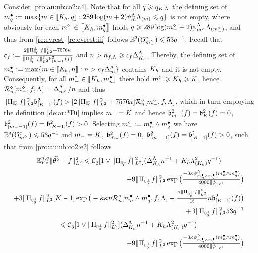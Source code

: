 \begin{pro}
Consider \ref{pro:au:ub:co2:c4}. Note that for all $\ssE\geq \ssE_{K,\iSv}$ the defining set of
$\sDi{\ssE}:=\max\{\Di\in\nset{K_{\ydf},\ssE}:289\log(\Di+2)\cmiSv[\Di]\miSv[\Di]\leq\ssE\}$
is not empty, where obviously for each
$\mdDi\in\nset{K_{\ydf},\sDi{\ssE}}$ holds 
$\ssE\geq289\log(\mdDi+2)\cmiSv[\mdDi]\miSv[\mdDi]$, and thus from
\cref{re:evrest} \ref{re:evrest:iii} follows
$\FuVg[\ssE]{\rE}(\aixEv[\mdDi]^c)\leq 53\ssE^{-1}$.
Recall that $c_{\xdf}:=\tfrac{2\VnormLp{\Proj[{\mHiH[0]}]^\perp\xdf}^2+7576\cpen}{\VnormLp{\Proj[{\mHiH[0]}]^\perp\xdf}^2\bias[{[K-1]}]^2(\xdf)}$
and $\ssY>\ssY_{\xdf,\iSv}\geq c_{\xdf}\DipenSv[K_{\ydf}]$. Thereby,
the defining set of
$\sDi{\ssY}:=\max\{\Di\in\nset{K_{\ydf},\ssY}:\ssY>c_{\xdf}\DipenSv\}$
contains $K_{\ydf}$ and it is not empty. Consequently, for all
$\mdDi\in\nset{K_{\ydf},\sDi{\ssY}}$ there hold $\mdDi\geq K_{\ydf}\geq K$, hence
$\hRaDi{\mdDi,\xdf,\iSv}=\DipenSv[\mdDi]/\ssY$  and thus $\VnormLp{\Proj[{\mHiH[0]}]^\perp\xdf}^2\bias[{[K-1]}]^2(\xdf)>[2\VnormLp{\Proj[{\mHiH[0]}]^\perp\xdf}^2+7576\cpen]\hRaDi{\mdDi,\xdf,\iSv}$,
  which in turn employing the definition
  \eqref{de:au:*Di} implies  $\mDi=K$ and hence
  $\bias[\mDi]^2(\xdf)=\bias[K]^2(\xdf)=0$,
  $\bias[{[\mDi-1]}]^2(\xdf)=\bias[{[K-1]}]^2(\xdf)>0$. Selecting
  $\mdDi:=\sDi{\ssY}\wedge\sDi{\ssE}$ we have 
$\FuVg[\ssE]{\rE}(\aixEv[\mdDi]^c)\leq 53\ssE^{-1}$ and 
$\mDi=K$, $\bias[\mDi]^2(\xdf)=0$,
  $\bias[{[\mDi-1]}]^2(\xdf)=\bias[{[K-1]}]^2(\xdf)>0$, such that 
 from  \eqref{pro:au:ub:co2:e2} follows
\begin{multline}\label{pro:au:ub:co2:e4}
\FuEx[\ssY,\ssE]{\rY,\rE}\VnormLp{\hxdfPr[]-\xdf}^2
\leq\cst{2}[1\vee\VnormLp{\Proj[{\mHiH[0]^\perp}]\xdf}^2](\DipenSv[K_{\ydf}]\ssY^{-1}+K_{\ydf}\miSv[K_{\ydf}]^2\ssE^{-1})
\\
\hfill+9
\VnormLp{\Proj[{\mHiH[0]^\perp}]\xdf}^2\exp\big(\tfrac{-3\cpen\cmiSv[\sDi{\ssY}\wedge\sDi{\ssE}](\sDi{\ssY}\wedge\sDi{\ssE})}{4000\Vnormlp[1]{\fydf}}\big)
\\\hfill
+3
\VnormLp{\Proj[{\mHiH[0]^\perp}]\xdf}^2[K-1]\exp\big(-\rWc\cpen\ssY\hRaDi{\sDi{\ssY}\wedge\sDi{\ssE},\xdf,\iSv}-
\tfrac{\rWc\VnormLp{\Proj[{\mHiH[0]^\perp}]\xdf}^2}{16}\ssY\bias[{[K-1]}]^2(\xdf)\big)\\\null\hfill
+3
\VnormLp{\Proj[{\mHiH[0]^\perp}]\xdf}^2 53\ssE^{-1}\\
\leq\cst{3}[1\vee\VnormLp{\Proj[{\mHiH[0]^\perp}]\xdf}^2](\DipenSv[K_{\ydf}]\ssY^{-1}+K_{\ydf}\miSv[K_{\ydf}]^2\ssE^{-1})\\
\hfill+9
\VnormLp{\Proj[{\mHiH[0]^\perp}]\xdf}^2\exp\big(\tfrac{-3\cpen\cmiSv[\sDi{\ssY}\wedge\sDi{\ssE}](\sDi{\ssY}\wedge\sDi{\ssE})}{4000\Vnormlp[1]{\fydf}}\big)

\end{multline}
\end{pro}
